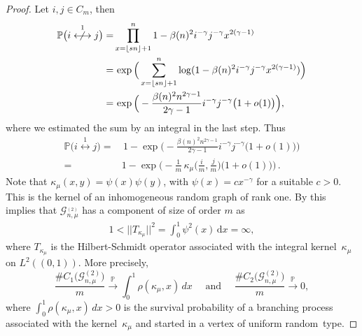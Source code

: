 \documentclass[12pt,a4paper]{article}
\numberwithin{equation}{section}
\begin{document}
 \begin{proof}
Let $i,j\in C_m$, then
\begin{align*}
    \mathbb P \big( i\overset{1}{\centernot\longleftrightarrow}  j \big) = & \prod_{x=\lfloor sn \rfloor +1}^n 1 - \beta(n)^2i^{-\gamma}j^{-\gamma}x^{2(\gamma-1)}
     \\ = & \, \exp \Big(\sum_{x=\lfloor sn \rfloor +1}^n \log(1-\beta(n)^2i^{-\gamma}j^{-\gamma}x^{2(\gamma-1)})\Big)
    \\ = & \, \exp \Big( - \frac{\beta(n)^2n^{2\gamma-1}}{2\gamma-1}i^{-\gamma}j^{-\gamma}\big(1+o(1)\big)\Big),
\end{align*}
where we estimated the sum by an integral in the last step. Thus
\begin{equation}\label{rankone}
\begin{aligned} 
     \mathbb P \big( i\overset{1}{\longleftrightarrow}  j \big) = & \, 1- \exp\Big(- \frac{\beta(n)^2n^{2\gamma-1}}{2\gamma-1}i^{-\gamma}j^{-\gamma}\big(1+o(1)\big)\Big) 
     \\ = &  1- \exp\Big(- \frac{1}{m}\, \kappa_\mu\Big( \frac{i}{m}, \frac{j}{m}\Big)\big(1+o(1)\big)\Big) \, .
\end{aligned}
\end{equation}
Note that $ \kappa_\mu(x,y)=\psi(x)\psi(y)$, with $\psi(x)=cx^{-\gamma}$ for a suitable  $c>0$. This is the kernel of an inhomogeneous random graph of rank one. 
By \cite[Theorem 3.1]{bjr} this implies that $\mathcal G_{n,\mu}^{_{(2)}}$ has a component of size of order $m$ as
\begin{align*}
    1<||T_{\kappa_\mu}||^2 = \int_0^1 \psi^2(x) \,\text{d}x = \infty,
\end{align*}
where $T_{\kappa_\mu}$ is the Hilbert-Schmidt operator associated with the integral kernel~$\kappa_\mu$
on $L^2((0,1))$. 
More precisely,
$$ \frac{\#C_1\big(\mathcal G_{n,\mu}^{(2)}\big)}{m}\overset{\mathbb P}{\longrightarrow} \int_0^1 \rho({\kappa_\mu}, x) \, dx\quad \text{ and } \quad \frac{\#C_2\big(\mathcal G_{n,\mu}^{(2)}\big)}{m}\overset{\mathbb P}{\longrightarrow}0,$$
where $\int_0^1 \rho({\kappa_\mu},x)\, dx>0$ is the survival probability of a branching process associated with the kernel~$\kappa_\mu$ and started in a vertex of uniform random~type.
     \end{proof}
     
\end{document}

